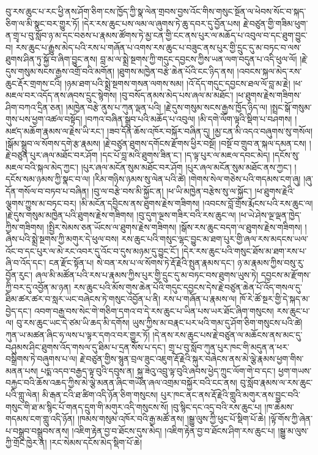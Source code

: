 \documentclass{article}
\begin{document}
བུ་རས་ཆུང་པ་རང་ཕྱི་ནས་ཤོག་ཅིག་ངས་ཁྱོད་ཀྱི་སྣ་ལེན་གྲབས་བྱས་འོང་གིས་གསུང་སྔོན་ལ་ཕེབས་སོང་བ་སྐད་ཅིག་ལ་མི་སྣང་བར་གྱུར་ཏོ། །དེར་རས་ཆུང་པས་ལམ་ལ་ཞུགས་ཏེ་ཆུ་དབར་དུ་བྱོན་པས། རྗེ་བཙུན་གྱི་གཟིམ་ཕུག་ན་གྲྭ་པ་བུ་སློབ་ཉ་མ་དང་བཅས་པ་རྣམས་ཚོགས་ཏེ་མྱ་ངན་གྱི་ངང་ནས་པུར་ལ་མཆོད་པ་འབུལ་བ་དང་ཐུག་བྱུང་བ། རས་ཆུང་པ་རྒྱུས་མེད་པའི་རས་པ་གཞོན་པ་འགས་རས་ཆུང་པ་བཟུང་ནས་པུར་གྱི་དྲུང་དུ་མ་བཏང་བ་ལས་ཐུགས་ཤིན་ཏུ་སྐྱོ་བ་ཞིག་བྱུང་ནས། བླ་མ་ལ་སྨྲེ་སྔགས་ཀྱི་གདུང་དབྱངས་ཀྱིས་ཡན་ལག་བདུན་པ་འདི་ཕུལ་ལོ། །རྗེ་དུས་གསུམ་སངས་རྒྱས་འགྲོ་བའི་མགོན། །ཐུགས་མཁྱེན་བརྩེ་ཆེན་པོའི་ངང་ཉིད་ནས། །འབངས་སྐལ་མེད་རས་ཆུང་རྡོར་གྲགས་ངའི། །ཉམ་ཐག་པའི་སྨྲེ་སྔགས་གསན་ལགས་སམ། །འོ་དོད་གདུང་དབྱངས་ཐལ་ལོ་བླ་མ་རྗེ། །ཕ་མཇལ་བར་འདོད་ནས་ཞབས་དྲུང་སྙེགས། །བུ་བསོད་ནམས་མེད་པས་ཞལ་མ་མཐོང་། །ཕ་ཐུགས་རྗེས་གཟིགས་ཤིག་བཀའ་དྲིན་ཅན། །མཁྱེན་བརྩེ་ནུས་པ་ཀུན་ལྡན་པའི། །རྗེ་དུས་གསུམ་སངས་རྒྱས་ཁྱོད་ཉིད་ལ། །སྤྲང་སྒོ་གསུམ་གུས་པས་ཕྱག་འཚལ་བསྟོད། །བཀའ་བཞིན་སྒྲུབ་པའི་མཆོད་པ་འབུལ། །མི་དགེ་ལོག་ལྟའི་སྡིག་པ་བཤགས། །མཛད་མཆོག་རྣམས་ལ་རྗེས་ཡི་རང་། །ཟབ་དོན་ཆོས་འཁོར་བསྐོར་བཞིན་དུ། །མྱ་ངན་མི་འདའ་བཞུགས་སུ་གསོལ། །སྒོམ་སྒྲུབ་ལ་སོགས་དགེ་རྩ་རྣམས། །རྗེ་བཙུན་ཐུགས་དགོངས་རྫོགས་ཕྱིར་བསྔོ། །བསྔོ་བ་གྲུབ་ན་སྐལ་དམན་ངས། །རྗེ་བཙུན་པུར་ཞལ་མཐོང་བར་ཤོག །དང་པོ་བླ་མའི་ཐུགས་ཟིན་ང་། །ད་ལྟ་པུར་ལ་མཇལ་དབང་མེད། །དངོས་སུ་མཇལ་བའི་སྐལ་མེད་ཀྱང་། །པུར་ཞལ་མངོན་སུམ་མཐོང་བར་ཤོག །པུར་ཞལ་མངོན་སུམ་མཐོང་ནས་ཀྱང་། །དངོས་སམ་ཉམས་ཀྱི་སྣང་བ་ལ། །རིམ་གཉིས་ཉམས་སུ་ལེན་པའི་ཚེ། །གེགས་སེལ་གཅེས་པའི་གདམས་ངག་ཞུ། །ཞུ་དོན་གསོལ་བ་བཏབ་པ་བཞིན། །བུ་ལ་བརྩེ་བས་མི་སྐྱོང་ན། །ཕ་ཡི་མཁྱེན་བརྩེས་སུ་ལ་སྐྱོང་། །ཕ་ཐུགས་རྗེའི་ལྕགས་ཀྱུས་མ་བཏང་བར། །མི་མངོན་དབྱིངས་ནས་ཐུགས་རྗེས་གཟིགས། །འབངས་བློ་གྲོས་རྨོངས་པའི་རས་ཆུང་ལ། །རྗེ་དུས་གསུམ་མཁྱེན་པའི་ཐུགས་རྗེས་གཟིགས། །བུ་དུག་ལྔས་གཟིར་བའི་རས་ཆུང་ལ། །ཕ་ཡེ་ཤེས་ལྔ་ལྡན་ཁྱེད་ཀྱིས་གཟིགས། །སྤྱིར་སེམས་ཅན་ཡོངས་ལ་ཐུགས་རྗེས་གཟིགས། །སྒོས་རས་ཆུང་བདག་ལ་ཐུགས་རྗེས་གཟིགས། །ཞེས་པའི་སྨྲེ་སྔགས་ཀྱི་མགུར་དེ་ཕུལ་བས། རས་ཆུང་པའི་གསུང་ལྷང་བྱུང་མ་ཐག་པུར་གྱི་ཞལ་རས་མདངས་ཡལ་འོང་བ་དང་པུར་ལ་མེ་རང་འབར་དུ་འོང་བ་དུས་མཉམ་དུ་བྱུང་ངོ་། །དེར་རས་ཆུང་པའི་གསུང་ཐོས་མ་ཐག་རས་པ་ཞི་བ་འོད་དང་། ངན་རྫོང་སྟོན་པ། སེ་བན་རས་པ་ལ་སོགས་ཏེ་རྡོ་རྗེའི་སྤུན་རྣམས་དང་། ཉ་མ་རྣམས་ཀྱིས་བསུ་རུ་བྱོན་རུང་། ཞལ་མི་མཚོན་པའི་རས་པ་རྣམས་ཀྱིས་པུར་གྱི་དྲུང་དུ་མ་བཏང་བས་ཐུགས་ཡུས་ཏེ། དབྱངས་མ་རྫོགས་ཀྱི་བར་དུ་འབྱོན་མ་ཉན། རས་ཆུང་པའི་མོས་གུས་ཆེན་པོའི་གདུང་དབྱངས་དེས་རྗེ་བཙུན་ཆེན་པོ་འོད་གསལ་དུ་ཐིམ་ཚར་ཚར་བ་སླར་ཡང་བཞེངས་ཏེ་གསུང་འབྱོན་པ་ནི། རས་པ་གཞོན་པ་རྣམས་ལ། ཁོ་རེ་ཚོ་སྔར་གྱི་དེ་སྐད་མ་བྱེད་དང་། འབག་བརྒྱ་བས་སེང་གེ་གཅིག་དགའ་བ་དེ་རས་ཆུང་པ་ཡིན་པས་ཡར་ཐོང་ཞིག་གསུངས། རས་ཆུང་པ་ལ། བུ་རས་ཆུང་ཡང་དེ་ཙམ་ཡི་ཆད་མི་དགོས། ཡུས་ཀྱིས་མ་བརྣང་པར་ཕའི་གམ་དུ་ཤོག་ཅིག་གསུངས་པའི་ཚེ། ཀུན་ཡ་མཚན་ཞིང་ཧ་ལས་པ་ལྟར་དགའ་བར་གྱུར་ཏོ། །དེ་ནས་རས་ཆུང་པས་རྗེ་བཙུན་ལ་མཆོངས་ནས་མང་དུ་བཤུམས་ཤིང་ཐུགས་འོད་གསལ་དུ་ཐིམ་པ་དྲན་སོས་པ་དང་། གྲྭ་པ་བུ་སློབ་ཀུན་པུར་ཁང་གི་མདུན་ན་ཕར་བསྒྲིགས་ཏེ་བཞུགས་པ་ལ། རྗེ་བཙུན་གྱིས་སྙུན་བྲལ་ཟུང་འཇུག་རྡོ་རྗེའི་སྐུར་བཞེངས་ནས་མེ་ལྕེ་རྣམས་ཕྱག་གིས་མནན་པས། པདྨ་འདབ་བརྒྱད་ལྟ་བུའི་དབུས་ན། སྐུ་ཟེའུ་འབྲུ་ལྟ་བུའི་ཞབས་ཕྱེད་ཀྲུང་ལོག་གེ་བ་དང་། ཕྱག་གཡས་བརྐྱང་བའི་ཆོས་འཆད་ཀྱིས་མེ་ལྕེ་མནན་ཞིང་གཡོན་ཞལ་འགྲམ་བསྐྱོར་བའི་ངང་ནས། བུ་སློབ་རྣམས་ལ་རས་ཆུང་པའི་གླུ་ལེན། མི་རྒན་ངའི་ཐ་ཚིག་འདི་ཉོན་ཅིག་གསུངས། པུར་ཁང་ནང་ནས་རྡོ་རྗེའི་གླུའི་མགུར་ནས་བྱུང་བའི་གསུང་གི་ཐ་མ་སྙིང་པོ་གནད་དྲུག་གི་མགུར་འདི་གསུངས་སོ། །བུ་སྙིང་དང་འདྲ་བའི་རས་ཆུང་པ། །ཁ་ཆེམས་གདམས་ངག་གླུ་འདི་ཉོན། །ཁམས་གསུམ་འཁོར་བའི་རྒྱ་མཚོ་ནས། །སྒྱུ་ལུས་ཀྱི་ཕུང་པོ་སྡིག་པོ་ཆེ། །ལྟོ་གོས་ཀྱི་ཞེན་པ་བསྒྲུབ་བསྒྲུབས་ནས། །འཇིག་རྟེན་བྱ་བ་ཐོངས་དུས་མེད། །འཇིག་རྟེན་བྱ་བ་ཐོངས་ཤིག་རས་ཆུང་པ། །སྒྱུ་མ་ལུས་ཀྱི་གྲོང་ཁྱེར་ན། །རང་སེམས་དངོས་མེད་སྡིག་པོ་ཆེ། 
\end{document}
